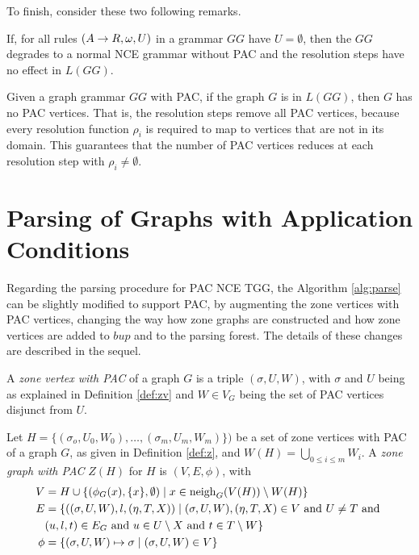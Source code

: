 To finish, consider these two following remarks.

\begin{remark}
	If, for all rules $(A \to R,\omega,U)$ in a grammar $GG$ have $U = \emptyset$, then the $GG$ degrades to a normal NCE grammar without PAC and the resolution steps have no effect in $L(GG)$.
\end{remark}

\begin{remark}
	Given a graph grammar $GG$ with PAC, if the graph $G$ is in $L(GG)$, then $G$ has no PAC vertices. That is, the resolution steps remove all PAC vertices, because every resolution function $\rho_i$ is required to map to vertices that are not in its domain. This guarantees that the number of PAC vertices reduces at each resolution step with $\rho_i \neq \emptyset$.
\end{remark}

\section{Parsing of Graphs with Application Conditions}
Regarding the parsing procedure for PAC NCE TGG, the Algorithm \ref{alg:parse} can be slightly modified to support PAC, by augmenting the zone vertices with PAC vertices, changing the way how zone graphs are constructed and how zone vertices are added to $bup$ and to the parsing forest. The details of these changes are described in the sequel.

\begin{definition}
	A \emph{zone vertex with PAC} of a graph $G$ is a triple $(\sigma, U, W)$, with $\sigma$ and $U$ being as explained in Definition \ref{def:zv} and $W \in V_G$ being the set of PAC vertices disjunct from $U$.
\end{definition}

\begin{definition}
	Let $H = \{(\sigma_o,U_0,W_0), \dots, (\sigma_m, U_m, W_m)\})$ be a set of zone vertices with PAC of a graph $G$, as given in Definition \ref{def:z}, and $W(H) = \bigcup_{0 \le i \le m}{W_i}$. A \emph{zone graph with PAC} $Z(H)$ for $H$ is $(V,E,\phi)$, with
	\begin{align*}
		V & = H \cup \{(\phi_G(x),\{x\}, \emptyset) \; | \; x \in \operatorname{neigh}_{G}(V(H)) \setminus W(H) \} \\
		E & = \{((\sigma,U,W),l,(\eta,T,X)) \; | \; (\sigma,U,W),(\eta,T,X) \in V \text{ and } U \neq T \text{ and } \\
		& (u,l,t) \in E_G \text{ and } u \in U \setminus X \text{ and } t \in T \setminus W \} \\
		\phi & = \{(\sigma,U,W) \mapsto \sigma \; | \; (\sigma,U,W) \in V\}
	\end{align*}
\end{definition}


